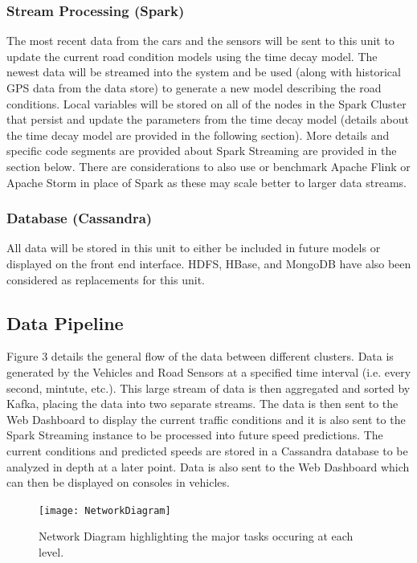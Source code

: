 \documentclass{vldb}
\begin{document}
\subsubsection{Stream Processing (Spark)}
The most recent data from the cars and the sensors will be sent to this unit to update the current road condition models using the time decay model. The newest data will be streamed into the system and be used (along with historical GPS data from the data store) to generate a new model describing the road conditions. Local variables will be stored on all of the nodes in the Spark Cluster that persist and update the parameters from the time decay model (details about the time decay model are provided in the following section). More details and specific code segments are provided about Spark Streaming are provided in the section below. There are considerations to also use or benchmark Apache Flink or Apache Storm in place of Spark as these may scale better to larger data streams. 

\subsubsection{Database (Cassandra)}
All data will be stored in this unit to either be included in future models or displayed on the front end interface. HDFS, HBase, and MongoDB have also been considered as replacements for this unit. 

\subsection{Data Pipeline}
Figure 3 details the general flow of the data between different clusters.  Data is generated by the Vehicles and Road Sensors at a specified time interval (i.e. every second, mintute, etc.). This large stream of data is then aggregated and sorted by Kafka, placing the data into two separate streams. The data is then sent to the Web Dashboard to display the current traffic conditions and it is also sent to the Spark Streaming instance to be processed into future speed predictions. The current conditions and predicted speeds are stored in a Cassandra database to be analyzed in depth at a later point. Data is also sent to the Web Dashboard which can then be displayed on consoles in vehicles. 


\begin{figure}
\centering
\texttt{[image: NetworkDiagram]}
\caption{Network Diagram highlighting the major tasks occuring at each level.}
\label{fig:networkdiagram}
\end{figure}
\end{document}
